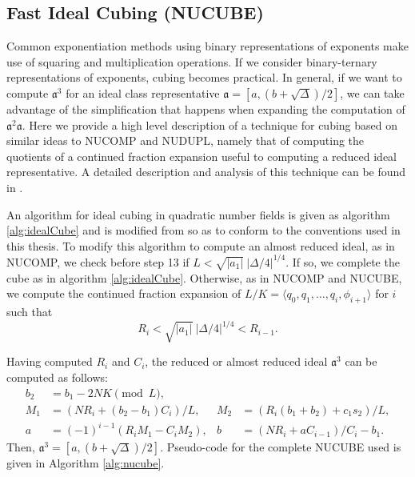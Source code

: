 \documentclass{ucalgthes1}
\theoremstyle{definition}
\begin{document}
\subsection{Fast Ideal Cubing (NUCUBE)}\label{subsec:nucube}

Common exponentiation methods using binary representations of exponents make use of squaring and multiplication operations.  If we consider binary-ternary representations of exponents, cubing becomes practical.  In general, if we want to compute ${\mathfrak a}^3$ for an ideal class representative $\mathfrak a = [a, (b+\sqrt\Delta)/2]$, we can take advantage of the simplification that happens when expanding the computation of ${\mathfrak a}^2 \mathfrak a$.  Here we provide a high level description of a technique for cubing based on similar ideas to NUCOMP and NUDUPL, namely that of computing the quotients of a continued fraction expansion useful to computing a reduced ideal representative.  A detailed description and analysis of this technique can be found in \cite{Ijs2010}.

An algorithm for ideal cubing in quadratic number fields is given as algorithm \ref{alg:idealCube} and is modified from \cite[Appendix A, Algorithm 5]{Ijs2010} so as to conform to the conventions used in this thesis. To modify this algorithm to compute an almost reduced ideal, as in NUCOMP, we check before step 13 if $L < \sqrt{|a_1|} ~ |\Delta/4|^{1/4}$.  If so, we complete the cube as in algorithm \ref{alg:idealCube}.  Otherwise, as in NUCOMP and NUCUBE, we compute the continued fraction expansion of $L/K = \langle q_0, q_1, \dots, q_i, \phi_{i+1}\rangle$ for $i$ such that
\[
	R_i < \sqrt{|a_1|} ~ |\Delta/4|^{1/4} < R_{i-1}.
\]

\noindent
Having computed $R_i$ and $C_i$, the reduced or almost reduced ideal ${\mathfrak a}^3$ can be computed as follows:
\begin{align*}
	b_2 &= b_1 -2NK \pmod L, & \\
	M_1 &= (NR_i + (b_2-b_1)C_i)/L, &
	M_2 &= (R_i(b_1+b_2)+c_1s_2)/L, \\
	a &= (-1)^{i-1}(R_iM_1-C_iM_2), &
	b &= (NR_i + aC_{i-1})/C_i-b_1.
\end{align*}
Then, $\mathfrak a^3 = [a, (b+\sqrt\Delta)/2]$.  Pseudo-code for the complete NUCUBE used is given in Algorithm \ref{alg:nucube}.
\end{document}
